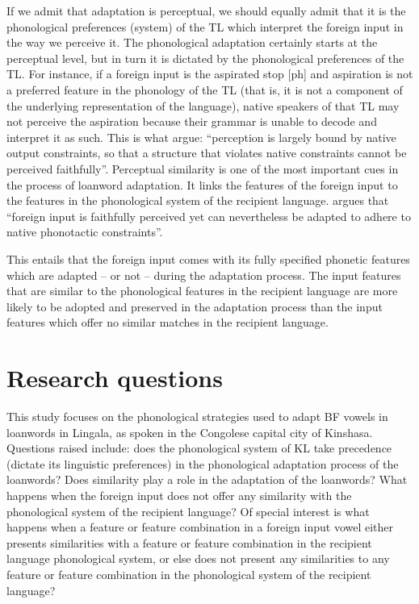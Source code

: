 \documentclass[output=paper]{langscibook}
\begin{document}
If we admit that adaptation is perceptual, we should equally admit that it is the phonological preferences (system) of the TL which interpret the foreign input in the way we perceive it. The phonological adaptation certainly starts at the perceptual level, but in turn it is dictated by the phonological preferences of the TL. For instance, if a foreign input is the aspirated stop [ph] and aspiration is not a preferred feature in the phonology of the TL (that is, it is not a component of the underlying representation of the language), native speakers of that TL may not perceive the aspiration because their grammar is unable to decode and interpret it as such. This is what \citet[6]{boersma2009loanword} argue: “perception is largely bound by native output constraints, so that a structure that violates native constraints cannot be perceived faithfully”.
Perceptual similarity is one of the most important cues in the process of loanword adaptation. It links the features of the foreign input to the features in the phonological system of the recipient language. \citet[6]{kang2011loanword} argues that “foreign input is faithfully perceived yet can nevertheless be adapted to adhere to native phonotactic constraints”.

This entails that the foreign input comes with its fully specified phonetic features which are adapted – or not – during the adaptation process. The input features that are similar to the phonological features in the recipient language are more likely to be adopted and preserved in the adaptation process than the input features which offer no similar matches in the recipient language.

\section{Research questions}
This study focuses on the phonological strategies used to adapt BF vowels in loanwords in Lingala, as spoken in the Congolese capital city of Kinshasa. Questions raised include: does the phonological system of KL take precedence (dictate its linguistic preferences) in the phonological adaptation process of the loanwords? Does similarity play a role in the adaptation of the loanwords? What happens when the foreign input does not offer any similarity with the phonological system of the recipient language? Of special interest is what happens when a feature or feature combination in a foreign input vowel either presents similarities with a feature or feature combination in the recipient language phonological system, or else does not present any similarities to any feature or feature combination in the phonological system of the recipient language?
\end{document}
